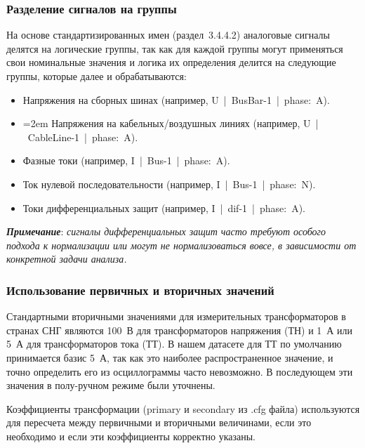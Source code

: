 \subsubsection{Разделение сигналов на группы}\label{sec:ch3_signal_groups}

На основе стандартизированных имен (раздел~3.4.4.2) аналоговые сигналы делятся на
логические группы, так как для каждой группы могут применяться свои номинальные значения
и логика их определения делится на следующие группы, которые далее и обрабатываются:

\begin{itemize}
\item Напряжения на сборных шинах (например, U~|~BusBar-1~|~phase:~A).
\item {\emergencystretch=2em Напряжения на кабельных/воздушных линиях (например, U~|~CableLine-1~|~phase:~A).\par}
\item Фазные токи (например, I~|~Bus-1~|~phase:~A).
\item Ток нулевой последовательности (например, I~|~Bus-1~|~phase:~N).
\item Токи дифференциальных защит (например, I~|~dif-1~|~phase:~A).
\end{itemize}

\noindent\textbf{\textit{Примечание}}: \textit{сигналы дифференциальных защит часто требуют особого подхода к нормализации или могут не нормализоваться вовсе, в зависимости от конкретной задачи анализа.}

\subsubsection{Использование первичных и вторичных значений}\label{sec:ch3_primary_secondary_values}

Стандартными вторичными значениями для измерительных трансформаторов в странах СНГ
являются 100~В для трансформаторов напряжения (ТН) и 1~А или 5~А для трансформаторов
тока (ТТ). В нашем датасете для ТТ по умолчанию принимается базис 5~А, так как это
наиболее распространенное значение, и точно определить его из осциллограммы часто
невозможно. В последующем эти значения в полу-ручном режиме были уточнены.

Коэффициенты трансформации (primary и secondary из .cfg файла) используются для
пересчета между первичными и вторичными величинами, если это необходимо и если эти
коэффициенты корректно указаны.

